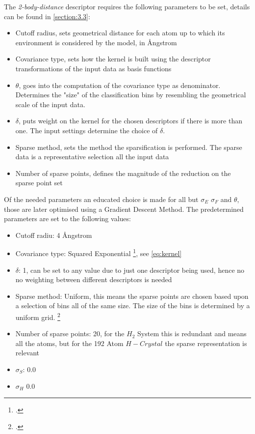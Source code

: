 The \textit{2-body-distance} descriptor requires the following parameters to be set, details can be found in \ref{section:3.3}: 
\begin{itemize}
	\item Cutoff radius, sets geometrical distance for each atom up to which its environment is considered by the model, in \AA ngstrom 
	\item Covariance type, sets how the kernel is built using the descriptor transformations of the input data as basis functions
	\item $\theta$, goes into the computation of the covariance type as denominator. Determines the "size" of the classification bins by resembling the geometrical scale of the input data.
	\item $\delta$, puts weight on the kernel for the chosen descriptors if there is more than one. The input settings determine the choice of  $\delta$. 
	\item Sparse method, sets the method the sparsification is performed. The sparse data is  a representative selection all the input data
	\item Number of sparse points, defines the magnitude of the reduction on the sparse point set
\end{itemize}

Of the needed parameters an educated choice is made for all but $\sigma_E$ $\sigma_F$ and $\theta$, those are later optimised using a Gradient Descent Method. The predetermined parameters are set to the following values:

\begin{itemize}
	\item Cutoff radiu: 4 \AA ngstrom
	\item Covariance type: Squared Exponential \footcite[Appendix 2.1.]{GAP-2009}, see \ref{eq:kernel} 
	\item $\delta$: 1, can be set to any value due to just one descriptor being used, hence no no weighting between different descriptors is needed
	\item Sparse method: Uniform, this means the sparse points are chosen based upon a selection of bins all of the same size. The size of the bins is determined by a uniform grid. \footcite[2]{sparse_uniform}
	\item Number of sparse points: 20, for the $H_2$ System this is redundant and means all the atoms, but for the 192 Atom $H-Crystal$ the sparse representation is relevant
	\item $\sigma_S$: 0.0 
	 \item $\sigma_H$ 0.0 
\end{itemize}

